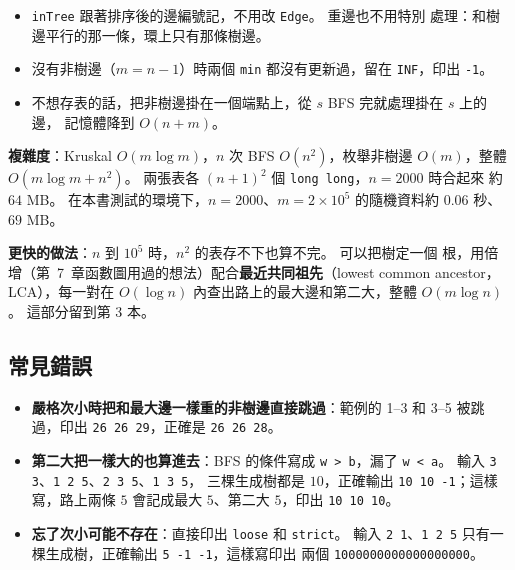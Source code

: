 
\begin{itemize}
\item \texttt{inTree} 跟著排序後的邊編號記，不用改 \texttt{Edge}。 重邊也不用特別
處理：和樹邊平行的那一條，環上只有那條樹邊。
\item 沒有非樹邊（$m = n - 1$）時兩個 \texttt{min} 都沒有更新過，留在
\texttt{INF}，印出 \texttt{-1}。
\item 不想存表的話，把非樹邊掛在一個端點上，從 $s$ BFS 完就處理掛在 $s$ 上的邊，
記憶體降到 $O(n + m)$。
\end{itemize}

\textbf{複雜度}：Kruskal $O(m \log m)$，$n$ 次 BFS $O(n^2)$，枚舉非樹邊 $O(m)$，整體
$O(m \log m + n^2)$。 兩張表各 $(n + 1)^2$ 個 \texttt{long long}，$n = 2000$ 時合起來
約 $64$ MB。 在本書測試的環境下，$n = 2000$、$m = 2 \times 10^5$ 的隨機資料約
$0.06$ 秒、$69$ MB。

\textbf{更快的做法}：$n$ 到 $10^5$ 時，$n^2$ 的表存不下也算不完。 可以把樹定一個
根，用倍增（第~7~章函數圖用過的想法）配合\textbf{最近共同祖先}（lowest common ancestor，LCA），每一對在 $O(\log n)$
內查出路上的最大邊和第二大，整體 $O(m \log n)$。 這部分留到第 3 本。

\subsection{常見錯誤}

\begin{itemize}
\item \textbf{嚴格次小時把和最大邊一樣重的非樹邊直接跳過}：範例的 1--3 和 3--5 被跳過，印出 \texttt{26 26 29}，正確是 \texttt{26 26 28}。
\item \textbf{第二大把一樣大的也算進去}：BFS 的條件寫成 \texttt{w > b}，漏了
\texttt{w < a}。 輸入 \texttt{3 3}、\texttt{1 2 5}、\texttt{2 3 5}、\texttt{1 3 5}，
三棵生成樹都是 $10$，正確輸出 \texttt{10 10 -1}；這樣寫，路上兩條 $5$ 會記成最大
$5$、第二大 $5$，印出 \texttt{10 10 10}。
\item \textbf{忘了次小可能不存在}：直接印出 \texttt{loose} 和 \texttt{strict}。 輸入
\texttt{2 1}、\texttt{1 2 5} 只有一棵生成樹，正確輸出 \texttt{5 -1 -1}，這樣寫印出
兩個 \texttt{1000000000000000000}。
\end{itemize}

